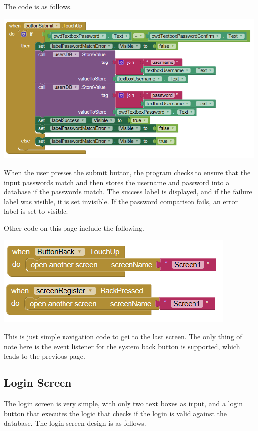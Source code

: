 \documentclass{scrreprt}
\begin{document}
The code is as follows.

\begin{center}
    \includegraphics[width=\linewidth]{images/registerButtonSubmit.png}
\end{center}

When the user presses the submit button, the program checks to ensure that the input passwords match and then stores the username and password into a database if the passwords match. The success label is displayed, and if the failure label was visible, it is set invisible. If the password comparison fails, an error label is set to visible.

Other code on this page include the following.

\begin{center}
    \includegraphics[width=0.75\linewidth]{images/registerOther.png}
\end{center}

This is just simple navigation code to get to the last screen. The only thing of note here is the event listener for the system back button is supported, which leads to the previous page.

\subsection{Login Screen}

The login screen is very simple, with only two text boxes as input, and a login button that executes the logic that checks if the login is valid against the database. The login screen design is as follows.
\end{document}
